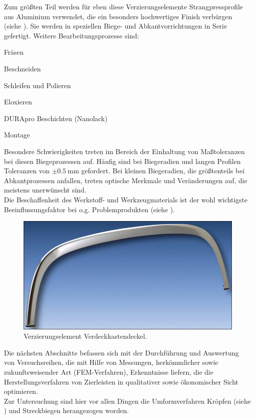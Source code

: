 \documentclass[12pt,a4paper,parskip,twoside,BCOR5mm,headsepline]{scrartcl}
\begin{document}
Zum größten Teil werden für eben diese Verzierungselemente
Strangpressprofile aus Aluminium verwendet, die ein besonders hochwertiges Finish verbürgen (siehe ). Sie werden in speziellen Biege- und Abkantvorrichtungen in Serie gefertigt.
 Weitere Bearbeitungsprozesse sind: \begin{itemize*}
 \item Fräsen
 \item Beschneiden
 \item Schleifen und Polieren
 \item Eloxieren
 \item DURApro Beschichten (Nanolack)
 \item Montage
 \end{itemize*}
   Besondere Schwierigkeiten treten im Bereich der Einhaltung von Maßtoleranzen bei diesen Biegeprozessen auf. Häufig sind bei  Biegeradien und langen Profilen Toleranzen von $\pm \SI{0.5}{\milli\meter}$ gefordert. Bei kleinen Biegeradien,  die größtenteils bei Abkantprozessen anfallen,  treten optische Merkmale und Veränderungen auf, die meistens unerwünscht sind.\\
 Die Beschaffenheit des Werkstoff- und Werkzeugmaterials ist der wohl wichtigste Beeinflussungsfaktor bei o.g. Problemprodukten (siehe ).
 


 \begin{figure}[hbtp]
 \centering
 \includegraphics[width=.8\textwidth]{BauteilNeu}
 \caption{Verzierungselement Verdeckkastendeckel.}
 \label{fig:Verdeckkastendeckel}
 \end{figure}

Die nächsten Abschnitte befassen sich mit der Durchführung und Auswertung von Versuchsreihen,  die mit Hilfe von Messungen, herkömmlicher sowie zukunftsweisender Art (FEM-Verfahren), Erkenntnisse liefern,   die die Herstellungsverfahren von Zierleisten  in qualitativer sowie ökonomischer Sicht  optimieren.\\
Zur Untersuchung   sind hier vor allen Dingen die Umformverfahren  Kröpfen (siehe )  und Streckbiegen herangezogen worden.
\end{document}
